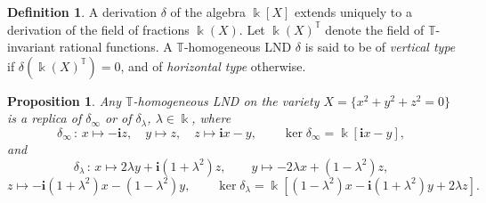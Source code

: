 \documentclass[a4paper,reqno,12pt]{amsart}
\theoremstyle{plain}
\newtheorem{proposition}[theorem]{Proposition}
\theoremstyle{definition}
\newtheorem{definition}[theorem]{Definition}
\theoremstyle{plain}
\theoremstyle{remark}
\newcommand{\TT}{\mathbb{T}}
\newcommand{\lmt}{\longmapsto}
\newcommand{\kk}{\Bbbk}
\newcommand{\ii}{\mathbf{i}}
\begin{document}
\begin{definition}
    A derivation $\delta$ of the algebra $\Bbbk[X]$ extends uniquely to a derivation of the field of fractions $\Bbbk(X)$. Let $\Bbbk(X)^{\TT}$ denote the field of ${\TT}$-invariant rational functions. A ${\TT}$-homogeneous LND $\delta$ is said to be of \emph{vertical type} if $\delta(\Bbbk(X)^{{\TT}})=0$, and of \emph{horizontal type} otherwise.
\end{definition}
\begin{proposition}\label{PropHomCase222}
    Any ${\TT}$-homogeneous LND on the variety $X=\{x^2+y^2+z^2=0\}$ is a replica of $\delta_\infty$ or of $\delta_\lambda$, $\lambda\in\kk$, where
    $$
    \delta_\infty\,\colon\,x\lmt -\ii z,\quad y\lmt z,\quad z\lmt \ii x-y,\qquad \ker\delta_\infty=\Bbbk[\ii x-y],
    $$
    and
    $$\delta_\lambda\,\colon\,x\lmt 2\lambda y+\ii (1+\lambda^2)z,\qquad y\lmt -2 \lambda x+(1-\lambda^2)z,$$
    $$z\lmt -\ii(1+\lambda^2)x-(1-\lambda^2)y,\qquad \ker\delta_\lambda=\Bbbk[(1-\lambda^2)x-\ii(1+\lambda^2)y + 2\lambda z].$$
\end{proposition}
\end{document}
